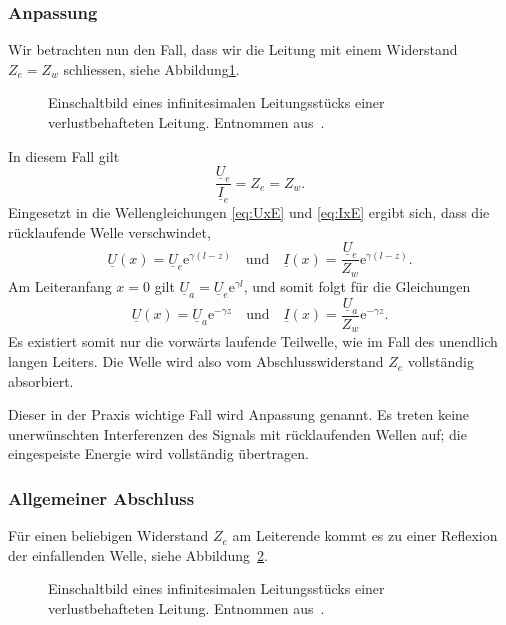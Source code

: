 \documentclass[paper=a4, parskip=half-, ngerman, fontsize=11pt]{scrreprt}
\begin{document}
\subsubsection{Anpassung}
Wir betrachten nun den Fall, dass wir die Leitung mit einem Widerstand $Z_{e} = Z_{w}$ schliessen, siehe
Abbildung\ref{AbschlussMitWiderstand}.
\begin{figure}[!htpb]
    \begin{center}
        
        \caption{Einschaltbild eines infinitesimalen Leitungsstücks einer verlustbehafteten Leitung. Entnommen
            aus~\cite{LeitungenUndFilter}.}
        \label{AbschlussMitWiderstand}
    \end{center}
\end{figure}
In diesem Fall gilt
\[ \frac{\underline{U}_{e}}{\underline{I}_{e}} = Z_{e} = Z_{w}. \]
Eingesetzt in die Wellengleichungen \eqref{eq:UxE} und \eqref{eq:IxE} ergibt sich, dass die rücklaufende Welle
verschwindet,
\[ \underline{U}(x) = \underline{U}_{e} \mathrm{e}^{\gamma (l - z)} \quad \text{und} \quad
\underline{I}(x) = \frac{\underline{U}_{e}}{Z_{w}} \mathrm{e}^{\gamma (l - z)}. \]
Am Leiteranfang $x = 0$ gilt $\underline{U}_{a} = \underline{U}_{e} \mathrm{e}^{\gamma l}$, und somit
folgt für die Gleichungen
\[ \underline{U}(x) = \underline{U}_{a} \mathrm{e}^{- \gamma z} \quad \text{und} \quad
\underline{I}(x) = \frac{\underline{U}_{a}}{Z_{w}} \mathrm{e}^{- \gamma z}. \]
Es existiert somit nur die vorwärts laufende Teilwelle, wie im Fall des unendlich langen Leiters. Die Welle wird also
vom Abschlusswiderstand $Z_{e}$ vollständig absorbiert.

Dieser in der Praxis wichtige Fall wird Anpassung genannt. Es treten keine unerwünschten Interferenzen des Signals mit
rücklaufenden Wellen auf; die eingespeiste Energie wird vollständig übertragen.

\subsubsection{Allgemeiner Abschluss}
Für einen beliebigen Widerstand $Z_{e}$ am Leiterende kommt es zu einer Reflexion der einfallenden Welle, siehe
Abbildung~\ref{ReflektierteWelle}.
\begin{figure}[!htpb]
    \begin{center}
        
        \caption{Einschaltbild eines infinitesimalen Leitungsstücks einer verlustbehafteten Leitung. Entnommen
            aus~\cite{LeitungenUndFilter}.}
        \label{ReflektierteWelle}
    \end{center}
\end{figure}
\end{document}
